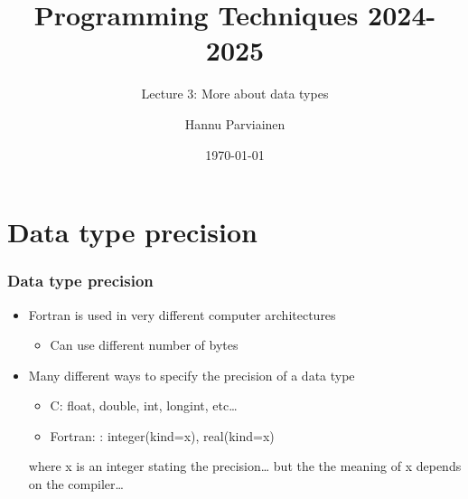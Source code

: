 \documentclass[10pt,aspectratio=169]{beamer}
\title{Programming Techniques 2024-2025}
\subtitle{Lecture 3: More about data types}
\author{Hannu Parviainen}
\institute{Universidad de la Laguna}
\date{\today}
\begin{document}
\begin{frame}
  \titlepage
\end{frame}

\section{Data type precision}
\begin{frame}
  \frametitle{Data type precision}
  \begin{itemize}
  \item   Fortran is used in very different computer architectures
  \begin{itemize}
    \item Can use different number of bytes
  \end{itemize}
  \end{itemize}

  \begin{itemize}
  \item   Many different ways to specify the precision of a data type
  \begin{itemize}
    \item C: float, double, int, longint, etc…
    \item Fortran: : integer(kind=x), real(kind=x)
  \end{itemize}
  where x is an integer stating the precision… but the the meaning of x depends on the compiler…
  \end{itemize}
\end{frame}
\end{document}

